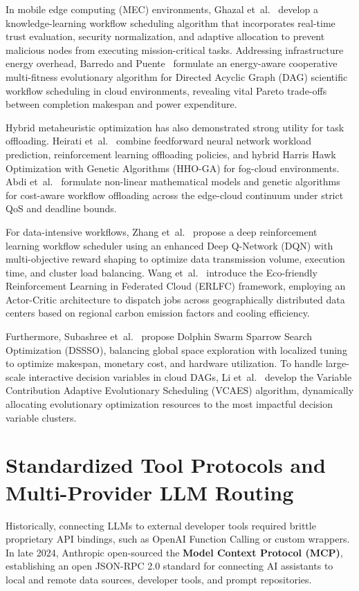 \documentclass[12pt,a4paper]{report}
\begin{document}
In mobile edge computing (MEC) environments, Ghazal et~al.~\cite{ref_ghazal2025_mecworkflow} develop a knowledge-learning workflow scheduling algorithm that incorporates real-time trust evaluation, security normalization, and adaptive allocation to prevent malicious nodes from executing mission-critical tasks. Addressing infrastructure energy overhead, Barredo and Puente~\cite{ref_barredo2025_multifitness} formulate an energy-aware cooperative multi-fitness evolutionary algorithm for Directed Acyclic Graph (DAG) scientific workflow scheduling in cloud environments, revealing vital Pareto trade-offs between completion makespan and power expenditure.

Hybrid metaheuristic optimization has also demonstrated strong utility for task offloading. Heirati et~al.~\cite{ref_heirati2026_fogcloud} combine feedforward neural network workload prediction, reinforcement learning offloading policies, and hybrid Harris Hawk Optimization with Genetic Algorithms (HHO-GA) for fog-cloud environments. Abdi et~al.~\cite{ref_abdi2024_edgecloud} formulate non-linear mathematical models and genetic algorithms for cost-aware workflow offloading across the edge-cloud continuum under strict QoS and deadline bounds.

For data-intensive workflows, Zhang et~al.~\cite{ref_zhang2023_dataintensive} propose a deep reinforcement learning workflow scheduler using an enhanced Deep Q-Network (DQN) with multi-objective reward shaping to optimize data transmission volume, execution time, and cluster load balancing. Wang et~al.~\cite{ref_wang2023_ecofriendly} introduce the Eco-friendly Reinforcement Learning in Federated Cloud (ERLFC) framework, employing an Actor-Critic architecture to dispatch jobs across geographically distributed data centers based on regional carbon emission factors and cooling efficiency.

Furthermore, Subashree et~al.~\cite{ref_subashree2025_dssso} propose Dolphin Swarm Sparrow Search Optimization (DSSSO), balancing global space exploration with localized tuning to optimize makespan, monetary cost, and hardware utilization. To handle large-scale interactive decision variables in cloud DAGs, Li et~al.~\cite{ref_li2023_vcaes} develop the Variable Contribution Adaptive Evolutionary Scheduling (VCAES) algorithm, dynamically allocating evolutionary optimization resources to the most impactful decision variable clusters.

\section{Standardized Tool Protocols and Multi-Provider LLM Routing}
Historically, connecting LLMs to external developer tools required brittle proprietary API bindings, such as OpenAI Function Calling or custom wrappers. In late 2024, Anthropic open-sourced the \textbf{Model Context Protocol (MCP)}, establishing an open JSON-RPC 2.0 standard for connecting AI assistants to local and remote data sources, developer tools, and prompt repositories.
\end{document}
